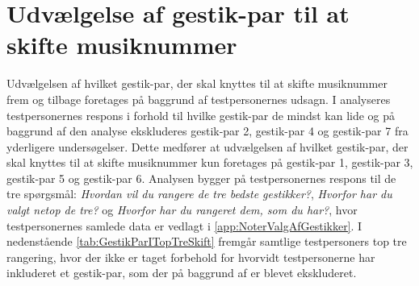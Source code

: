 \section{Udvælgelse af gestik-par til at skifte musiknummer}
\label{TestresultaterSkiftMusiknummer}
%
Udvælgelsen af hvilket gestik-par, der skal knyttes til at skifte musiknummer frem og tilbage foretages på baggrund af testpersonernes udsagn. I  analyseres testpersonernes respons i forhold til hvilke gestik-par de mindst kan lide og på baggrund af den analyse ekskluderes gestik-par 2, gestik-par 4 og gestik-par 7 fra yderligere undersøgelser. Dette medfører at udvælgelsen af hvilket gestik-par, der skal knyttes til at skifte musiknummer kun foretages på gestik-par 1, gestik-par 3, gestik-par 5 og gestik-par 6. Analysen bygger på testpersonernes respons til de tre spørgsmål: \textit{Hvordan vil du rangere de tre bedste gestikker?}, \textit{Hvorfor har du valgt netop de tre?} og \textit{Hvorfor har du rangeret dem, som du har?}, hvor testpersonernes samlede data er vedlagt i \autoref{app:NoterValgAfGestikker}.\blankline
%  
I nedenstående \autoref{tab:GestikParITopTreSkift} fremgår samtlige testpersoners top tre rangering, hvor der ikke er taget forbehold for hvorvidt testpersonerne har inkluderet et gestik-par, som der på baggrund af  er blevet ekskluderet.
%

